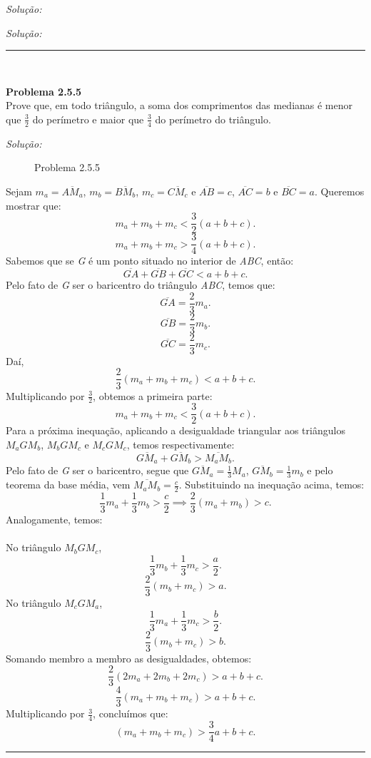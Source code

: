 \documentclass[a4paper, 11pt]{book}
\newenvironment{problem}[2][Problema] 
    { \begin{mdframed}[backgroundcolor=gray!20] \textbf{#1 #2} \\}
    {  \end{mdframed}}
\newenvironment{solution}
    {\textit{Solução:}}
    {}
\begin{document}
\begin{solution}
{\begin{solution}
\noindent\rule{7in}{2.8pt} \\

\begin{problem}{2.5.5}
    \label{prob:2.5.5}
    Prove que, em todo triângulo, a soma dos comprimentos das medianas é menor que $\frac{3}{2}$ do perímetro e maior que $\frac{3}{4}$ do perímetro do triângulo.
    
\end{problem}

\begin{solution}
    \begin{figure}[H]
        \centering
        
        \caption{Problema 2.5.5}
        \label{fig:2.5.5}
    \end{figure}
    Sejam $m_a=\overline{AM_a}$, $m_b=\overline{BM_b}$, $m_c=\overline{CM_c}$ e $\overline{AB}=c$, $\overline{AC}=b$ e $\overline{BC}=a$. Queremos mostrar que:
    \[
        m_a+m_b+m_c < \frac{3}{2}\left( a+b+c \right) 
    .\] 
    \[
        m_a+m_b+m_c > \frac{3}{4}\left( a+b+c \right) 
    .\] 
    Sabemos que se \textit{G} é um ponto situado no interior de \textit{ABC}, então:
    \[
    \overline{GA} + \overline{GB} + \overline{GC} < a + b + c
    .\] 
    Pelo fato de \textit{G} ser o baricentro do triângulo \textit{ABC}, temos que:
    \[
    \overline{GA} = \frac{2}{3}m_a
    .\] 
    \[
    \overline{GB} = \frac{2}{3}m_b
    .\] 
    \[
    \overline{GC} = \frac{2}{3}m_c
    .\] 
    Daí,
    \[
        \frac{2}{3}\left( m_a+m_b+m_c \right) < a+b+c 
    .\] 
    Multiplicando por $\frac{3}{2}$, obtemos a primeira parte:
    \[
        m_a+m_b+m_c < \frac{3}{2}\left( a+b+c \right) 
    .\] 
    Para a próxima inequação, aplicando a desigualdade triangular aos triângulos $M_aGM_b$,  $M_bGM_c$ e  $M_cGM_c$, temos respectivamente:
    \[
    \overline{GM_a} + \overline{GM_b} > \overline{M_aM_b}
    .\] 
    Pelo fato de \textit{G} ser o baricentro, segue que $\overline{GM_a}=\frac{1}{3}M_a$, $\overline{GM_b}=\frac{1}{3}m_b$ e pelo teorema da base média, vem $\overline{M_aM_b} = \frac{c}{2}$. Substituindo na inequação acima, temos:
    \[
        \frac{1}{3}m_a+\frac{1}{3}m_b > \frac{c}{2} \implies \frac{2}{3}\left( m_a+m_b \right) > c
    .\] 
    Analogamente, temos: \\\\
    No triângulo $M_bGM_c$,
    \[
        \frac{1}{3}m_b+\frac{1}{3}m_c > \frac{a}{2}
    .\] 
    \[
        \frac{2}{3}\left( m_b+m_c \right) > a
    .\] 
    No triângulo $M_cGM_a$,
    \[
    \frac{1}{3}m_a+\frac{1}{3}m_c > \frac{b}{2}
    .\] 
    \[
        \frac{2}{3}\left( m_b+m_c \right) > b
    .\] 
    Somando membro a membro as desigualdades, obtemos:
    \[
        \frac{2}{3}\left( 2m_a+2m_b+2m_c \right) > a+b+c 
    .\] 
    \[
        \frac{4}{3}\left( m_a+m_b+m_c \right) > a+b+c 
    .\] 
    Multiplicando por $\frac{3}{4}$, concluímos que:
    \[
        \left( m_a+m_b+m_c \right) > \frac{3}{4}a+b+c 
    .\] 
\end{solution}

\noindent\rule{7in}{2.8pt} \\
\end{document}
